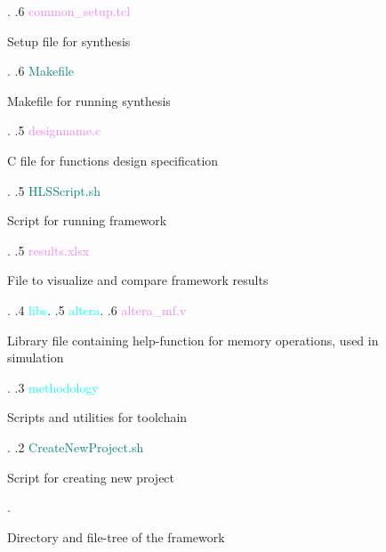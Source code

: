 \begin{figure}
\begin{minipage}{0.99\textwidth}
{\begin{minipage}[t]{6cm}
                                                            \end{minipage}.
    .6 \textcolor{violet}{common\_setup{.}tcl} \dotfill \:\:\begin{minipage}[t]{6cm}
                                                            Setup file for synthesis 
                                                            \end{minipage}.
    .6 \textcolor{teal}{Makefile} \dotfill \:\:\begin{minipage}[t]{6cm}
                                                            Makefile for running synthesis
                                                            \end{minipage}.
    .5 \textcolor{violet}{designname{.}c} \dotfill \:\:\begin{minipage}[t]{6cm}
                                                            C file for functions design specification
                                                            \end{minipage}.
    .5 \textcolor{teal}{HLSScript{.}sh} \dotfill \:\:\begin{minipage}[t]{6cm}
                                                            Script for running framework
                                                            \end{minipage}. 
    .5 \textcolor{violet}{results{.}xlsx} \dotfill \:\:\begin{minipage}[t]{6cm}
                                                            File to visualize and compare framework results
                                                            \end{minipage}. 
    .4 \textcolor{cyan}{libs}.
    .5 \textcolor{cyan}{altera}.
    .6 \textcolor{violet}{altera\_mf{.}v} \dotfill \:\:\begin{minipage}[t]{6cm}
                                                            Library file containing help-function for memory operations, used in simulation
                                                            \end{minipage}. 
    .3 \textcolor{cyan}{methodology} \dotfill \:\:\begin{minipage}[t]{6cm}
                                                            Scripts and utilities for toolchain
                                                            \end{minipage}. 
    .2 \textcolor{teal}{CreateNewProject{.}sh} \dotfill \:\:\begin{minipage}[t]{6cm}
                                                            Script for creating new project
                                                            \end{minipage}. 
    }
\end{minipage}
\caption{Directory and file-tree of the framework}
\label{fig:frameworkdirtree}
\end{figure}

